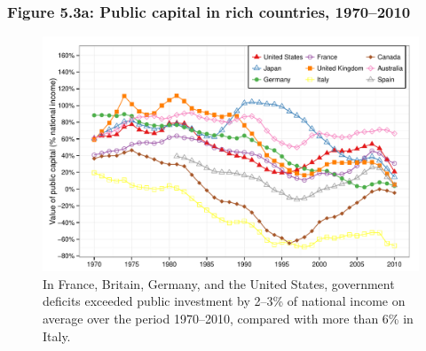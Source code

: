\documentclass[t]{beamer}\usepackage[]{graphicx}\usepackage[]{color}
\newenvironment{knitrout}{}{} %
\begin{document}
\begin{frame}[label=Figure_5_3a]
\frametitle{Figure 5.3a: Public capital in rich countries, 1970--2010}
\begin{figure}[t]
\begin{minipage}[b]{\textwidth}
\centering
\begin{knitrout}\footnotesize
{}\color{fgcolor}

{\centering \includegraphics[width=1\linewidth]{figures/color/Figure_5_3a} 

}



\end{knitrout}
\caption{In France, Britain, Germany, and the United States, government deficits exceeded public investment by 2--3\% of national income on average over the period 1970--2010, compared with more than 6\% in Italy.}
\end{minipage}
\end{figure}
\end{frame}
\end{document}
